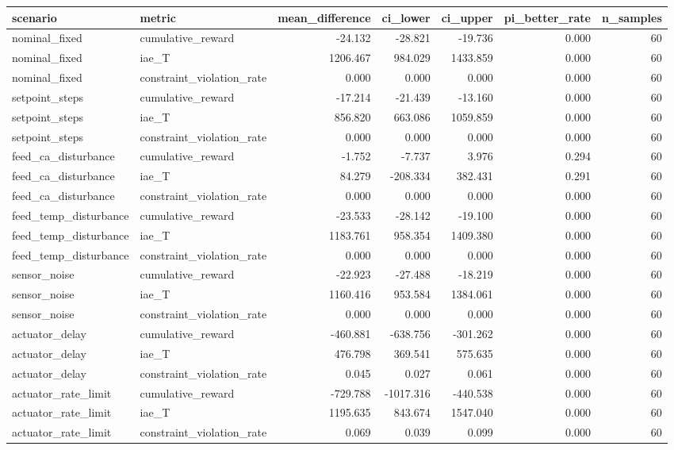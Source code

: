 \begin{tabular}{llrrrrr}
\toprule
scenario & metric & mean\_difference & ci\_lower & ci\_upper & pi\_better\_rate & n\_samples \\
\midrule
nominal\_fixed & cumulative\_reward & -24.132 & -28.821 & -19.736 & 0.000 & 60 \\
nominal\_fixed & iae\_T & 1206.467 & 984.029 & 1433.859 & 0.000 & 60 \\
nominal\_fixed & constraint\_violation\_rate & 0.000 & 0.000 & 0.000 & 0.000 & 60 \\
setpoint\_steps & cumulative\_reward & -17.214 & -21.439 & -13.160 & 0.000 & 60 \\
setpoint\_steps & iae\_T & 856.820 & 663.086 & 1059.859 & 0.000 & 60 \\
setpoint\_steps & constraint\_violation\_rate & 0.000 & 0.000 & 0.000 & 0.000 & 60 \\
feed\_ca\_disturbance & cumulative\_reward & -1.752 & -7.737 & 3.976 & 0.294 & 60 \\
feed\_ca\_disturbance & iae\_T & 84.279 & -208.334 & 382.431 & 0.291 & 60 \\
feed\_ca\_disturbance & constraint\_violation\_rate & 0.000 & 0.000 & 0.000 & 0.000 & 60 \\
feed\_temp\_disturbance & cumulative\_reward & -23.533 & -28.142 & -19.100 & 0.000 & 60 \\
feed\_temp\_disturbance & iae\_T & 1183.761 & 958.354 & 1409.380 & 0.000 & 60 \\
feed\_temp\_disturbance & constraint\_violation\_rate & 0.000 & 0.000 & 0.000 & 0.000 & 60 \\
sensor\_noise & cumulative\_reward & -22.923 & -27.488 & -18.219 & 0.000 & 60 \\
sensor\_noise & iae\_T & 1160.416 & 953.584 & 1384.061 & 0.000 & 60 \\
sensor\_noise & constraint\_violation\_rate & 0.000 & 0.000 & 0.000 & 0.000 & 60 \\
actuator\_delay & cumulative\_reward & -460.881 & -638.756 & -301.262 & 0.000 & 60 \\
actuator\_delay & iae\_T & 476.798 & 369.541 & 575.635 & 0.000 & 60 \\
actuator\_delay & constraint\_violation\_rate & 0.045 & 0.027 & 0.061 & 0.000 & 60 \\
actuator\_rate\_limit & cumulative\_reward & -729.788 & -1017.316 & -440.538 & 0.000 & 60 \\
actuator\_rate\_limit & iae\_T & 1195.635 & 843.674 & 1547.040 & 0.000 & 60 \\
actuator\_rate\_limit & constraint\_violation\_rate & 0.069 & 0.039 & 0.099 & 0.000 & 60 \\
\bottomrule
\end{tabular}
